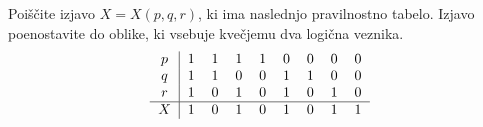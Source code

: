 \documentclass{izpit}
\begin{document}
%


\naloga[\tocke{25}]

  \podnaloga[15]
    Poiščite izjavo $X = X(p, q, r)$, ki ima naslednjo pravilnostno tabelo.
    Izjavo poenostavite do oblike, ki vsebuje kvečjemu dva logična veznika.
    \[
      \begin{tabular}{c|cccccccc}
        $p$ & 1 & 1 & 1 & 1 & 0 & 0 & 0 & 0 \\
        $q$ & 1 & 1 & 0 & 0 & 1 & 1 & 0 & 0 \\
        $r$ & 1 & 0 & 1 & 0 & 1 & 0 & 1 & 0 \\\hline
        $X$ & 1 & 0 & 1 & 0 & 1 & 0 & 1 & 1 \\
      \end{tabular}
    \]
  
\end{document}
